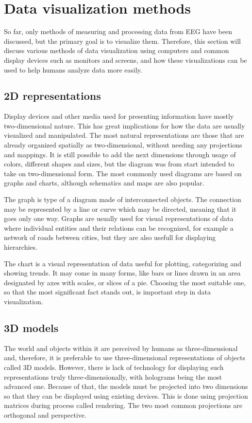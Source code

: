 \section{Data visualization methods}
So far, only methods of measuring and processing data from EEG have been
discussed, but the primary goal is to visualize them. Therefore, this section
will discuss various methods of data visualization using computers and common
display devices such as monitors and screens, and how these visualizations can
be used to help humans analyze data more easily.

\subsection{2D representations}
Display devices and other media used for presenting information have mostly
two-dimensional nature. This has great implications for how the data are usually
visualized and manipulated. The most natural representations are those that are
already organized spatially as two-dimensional, without needing any projections
and mappings. It is still possible to add the next dimensions through usage of
colors, different shapes and sizes, but the diagram was from start intended to
take on two-dimensional form. The most commonly used diagrams are based on
graphs and charts, although schematics and maps are also popular.

The graph is type of a diagram made of interconnected objects. The connection
may be represented by a line or curve which may be directed, meaning that it
goes only one way. Graphs are usually used for visual representations of data
where individual entities and their relations can be recognized, for example a
network of roads between cities, but they are also usefull for displaying
hierarchies.

The chart is a visual representation of data useful for plotting, categorizing
and showing trends. It may come in many forms, like bars or lines drawn in an
area designated by axes with scales, or slices of a pie. Choosing the most
suitable one, so that the most significant fact stands out, is important step in
data visualization.

\subsection{3D models}
The world and objects within it are perceived by humans as three-dimensional
and, therefore, it is preferable to use three-dimensional representations of
objects called 3D models. However, there is lack of technology for displaying
such representations truly three-dimensionally, with holograms being the most
advanced one. Because of that, the models must be projected into two dimensions
so that they can be displayed using existing devices. This is done using
projection matrices during process called rendering. The two most common
projections are orthogonal and perspective.

